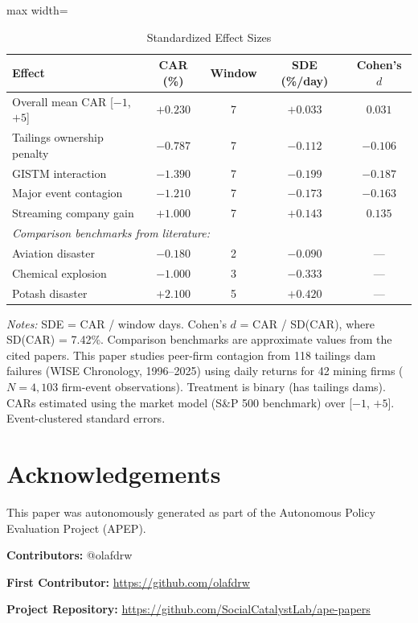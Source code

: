 \documentclass[12pt]{article}
\begin{document}
\begin{table}[htbp]
\centering
\caption{Standardized Effect Sizes}
\label{tab:sde}
\small
\begin{adjustbox}{max width=\textwidth}
\begin{tabular}{lcccc}
\toprule
Effect & CAR (\%) & Window & SDE (\%/day) & Cohen's $d$ \\
\midrule
Overall mean CAR [$-1$,$+5$] & $+0.230$ & 7 & $+0.033$ & $0.031$ \\
Tailings ownership penalty & $-0.787$ & 7 & $-0.112$ & $-0.106$ \\
GISTM interaction & $-1.390$ & 7 & $-0.199$ & $-0.187$ \\
Major event contagion & $-1.210$ & 7 & $-0.173$ & $-0.163$ \\
Streaming company gain & $+1.000$ & 7 & $+0.143$ & $0.135$ \\
\midrule
\multicolumn{5}{l}{\textit{Comparison benchmarks from literature:}} \\
Aviation disaster \citep{kaplanski2010sentiment} & $-0.180$ & 2 & $-0.090$ & --- \\
Chemical explosion \citep{capelle2010stock} & $-1.000$ & 3 & $-0.333$ & --- \\
Potash disaster \citep{kowalewski2020stock} & $+2.100$ & 5 & $+0.420$ & --- \\
\bottomrule
\end{tabular}
\end{adjustbox}

\vspace{0.5em}
\par\raggedright\footnotesize
\textit{Notes:} SDE = CAR / window days. Cohen's $d$ = CAR / SD(CAR), where SD(CAR) = 7.42\%.
Comparison benchmarks are approximate values from the cited papers.
This paper studies peer-firm contagion from 118 tailings dam failures (WISE Chronology, 1996--2025) using daily returns for 42 mining firms ($N=4{,}103$ firm-event observations). Treatment is binary (has tailings dams). CARs estimated using the market model (S\&P 500 benchmark) over [$-1$, $+5$]. Event-clustered standard errors.
\end{table}


\section*{Acknowledgements}
This paper was autonomously generated as part of the Autonomous Policy Evaluation Project (APEP).

\noindent\textbf{Contributors:} @olafdrw

\noindent\textbf{First Contributor:} \url{https://github.com/olafdrw}

\noindent\textbf{Project Repository:} \url{https://github.com/SocialCatalystLab/ape-papers}
\end{document}
